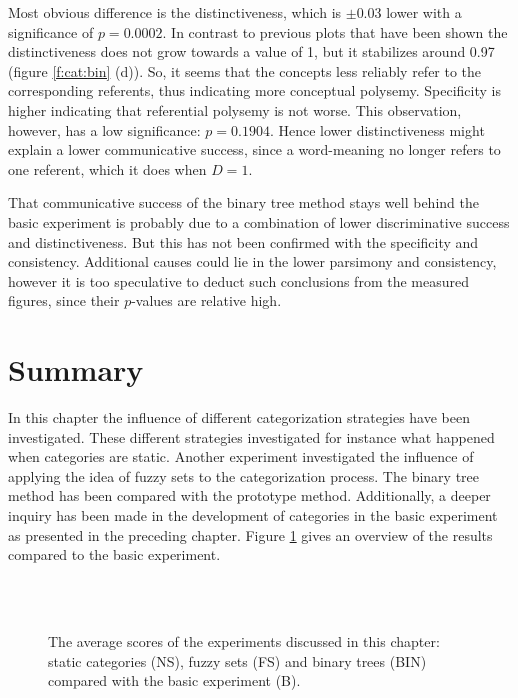 Most obvious difference is the distinctiveness, which is $\pm 0.03$ lower with a significance of $p=0.0002$. In contrast to previous plots that have been shown the distinctiveness does not grow towards a value of 1, but it stabilizes around 0.97 (figure \ref{f:cat:bin} (d)). So, it seems that the concepts less reliably refer to the corresponding referents, thus indicating more conceptual polysemy. Specificity is higher indicating that referential polysemy is not worse. This observation, however, has a low significance: $p=0.1904$. Hence lower distinctiveness might explain a lower communicative success, since a word-meaning no longer refers to one referent, which it does when $D=1$.

\p
That communicative success of the binary tree method stays well behind the basic experiment is probably due to a combination of lower discriminative success and distinctiveness. But this has not been confirmed with the specificity and consistency. Additional causes could lie in the lower parsimony and consistency, however it is too speculative to deduct such conclusions from the measured figures, since their $p$-values are relative high.

\section{Summary}

In this chapter the influence of different categorization strategies have been investigated. These different strategies investigated for instance what happened when categories are static. Another experiment investigated the influence of applying the idea of fuzzy sets to the categorization process. The binary tree method has been compared with the prototype method. Additionally, a deeper inquiry has been made in the development of categories in the basic experiment as presented in the preceding chapter. Figure \ref{f:cat:results} gives an overview of the results compared to the basic experiment.

\begin{figure}
\\
\\
\caption{The average scores of the experiments discussed in this chapter: static categories (NS), fuzzy sets (FS) and binary trees (BIN) compared with the basic experiment (B).}
\label{f:cat:results}
\end{figure}


